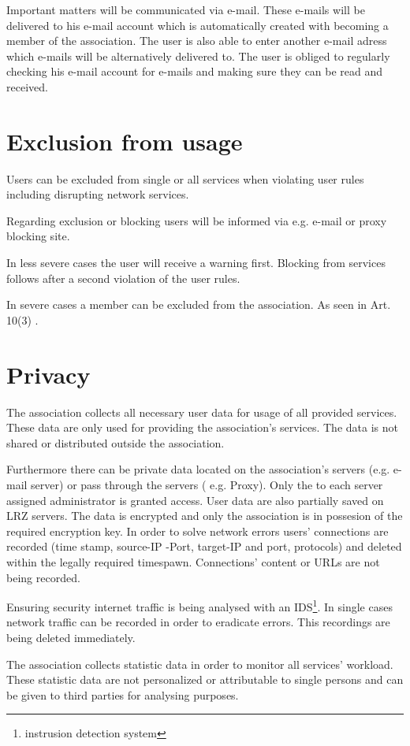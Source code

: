\documentclass[a4paper,10pt]{scrartcl}
\begin{document}
 Important matters will be communicated via e-mail. These e-mails will be delivered to his e-mail account which is automatically created with becoming a member of the association. The user is also able to enter another e-mail adress which e-mails will be alternatively delivered to. The user is obliged to regularly checking his e-mail account for e-mails and making sure they can be read and received. 

 \section{Exclusion from usage}
 Users can be excluded from single or all services when violating user rules including disrupting network services.

 Regarding exclusion or blocking users will be informed via e.g. e-mail or proxy blocking site.

 In less severe cases the user will receive a warning first. Blocking from services follows after a second violation of the user rules.

 In severe cases a member can be excluded from the association. As seen in Art. 10(3) .

 \section{Privacy}
 The association collects all necessary user data for usage of all provided services. These data are only used for providing the association's services. The data is not shared or distributed outside the association.

 Furthermore there can be private data located on the association's servers (e.g. e-mail server) or pass through the servers ( e.g. Proxy). Only the to each server assigned administrator is granted access.
User data are also partially saved on LRZ servers. The data is encrypted and only the association is in possesion of the required encryption key. In order to solve network errors users' connections are recorded (time stamp, source-IP -Port, target-IP and port, protocols) and deleted within the legally required timespawn. Connections' content or URLs are not being recorded.

 Ensuring security internet traffic is being analysed with an IDS\footnote{instrusion detection system}. In single cases network traffic can be recorded in order to eradicate errors. This recordings are being deleted immediately.

 The association collects statistic data in order to monitor all services' workload. These statistic data are not personalized or attributable to single persons and can be given to third parties for analysing purposes.
\end{document}
